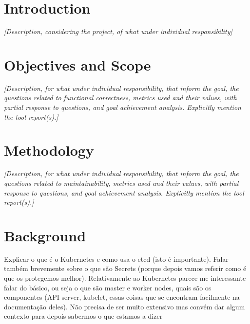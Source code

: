 \documentclass[a4paper,11pt,openright,BCOR=15mm]{scrbook}
\begin{document}
	
	
	
	\tableofcontents
	\listoffigures
	
	
	
	
	\mainmatter 
	
	

	\chapter{Introduction}
	
\textit{[Description, considering the project, of what under individual responsibility]}
	
	\chapter{Objectives and Scope}

\textit{	[Description, for what under individual responsibility, that inform the goal, the questions related to functional correctness, metrics used and their values, with partial response to questions, and goal achievement analysis. Explicitly mention the tool report(s).]}

	
	\chapter{Methodology}
\textit{	[Description, for what under individual responsibility, that inform the goal, the questions related to maintainability, metrics used and their values, with partial response to questions, and goal achievement analysis. Explicitly mention the tool report(s).]}
	
	
\chapter{Background}
Explicar o que é o Kubernetes e como usa o etcd (isto é importante). Falar também brevemente sobre o que são Secrets (porque depois vamos referir como é que os protegemos melhor). Relativamente ao Kubernetes parece-me interessante falar do básico, ou seja o que são master e worker nodes, quais são os componentes (API server, kubelet, essas coisas que se encontram facilmente na documentação deles). Não precisa de ser muito extensivo mas convém dar algum contexto para depois sabermos o que estamos a dizer
		
\end{document}
